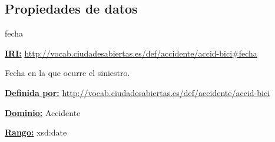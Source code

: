 \subsection{Propiedades de datos}



\begin{mybox}{fecha}
\begin{flushleft}
\underline{\textbf{IRI:}}
\url{http://vocab.ciudadesabiertas.es/def/accidente/accid-bici#fecha}
\newline

Fecha en la que ocurre el siniestro.
\newline

\underline{\textbf{Definida por:}}
\url{http://vocab.ciudadesabiertas.es/def/accidente/accid-bici}
\newline

\underline{\textbf{Dominio:}}
\newline Accidente
\newline

\underline{\textbf{Rango:}} 
\newline xsd:date

\end{flushleft}
\end{mybox}



